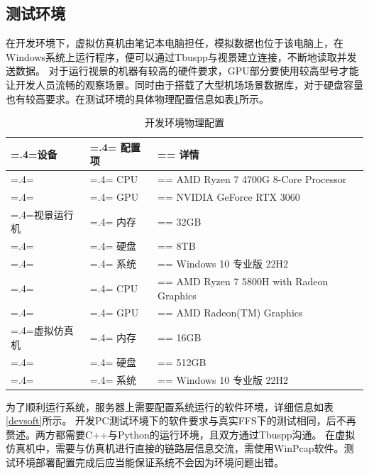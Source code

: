 \subsection{测试环境}
在开发环境下，虚拟仿真机由笔记本电脑担任，模拟数据也位于该电脑上，在Windows系统上运行程序，便可以通过Tbuspp与视景建立连接，不断地读取并发送数据。
对于运行视景的机器有较高的硬件要求，GPU部分要使用较高型号才能让开发人员流畅的观察场景。同时由于搭载了大型机场场景数据库，对于硬盘容量也有较高要求。在测试环境的具体物理配置信息如表\ref{devhard}所示。
\begin{table}[h!]
    \begin{center}
        \caption{开发环境物理配置}
        \renewcommand\arraystretch{1.5}
        \label{devhard}
        \begin{tabularx}{\textwidth}{ 
             >{\centering\arraybackslash\hsize=.4\hsize\linewidth=\hsize}X 
             >{\centering\arraybackslash\hsize=.4\hsize\linewidth=\hsize}X 
             >{\centering\arraybackslash\hsize=\hsize\linewidth=\hsize}X 
             }
             \hline
            \textbf{设备} & \textbf{配置项} & \textbf{详情}\\
             \hline
             & CPU & AMD Ryzen 7 4700G 8-Core Processor\\
           
             & GPU & NVIDIA GeForce RTX 3060\\
             
             视景运行机 & 内存 & 32GB\\
            
             & 硬盘 & 8TB\\
             
             & 系统 & Windows 10 专业版 22H2\\
             \hline
             & CPU & AMD Ryzen 7 5800H with Radeon Graphics\\
           
             & GPU & AMD Radeon(TM) Graphics\\
             
             虚拟仿真机 & 内存 & 16GB\\
            
             & 硬盘 & 512GB\\
             
             & 系统 & Windows 10 专业版 22H2\\
             \hline
            \end{tabularx}
    \end{center}
\end{table}
\par
为了顺利运行系统，服务器上需要配置系统运行的软件环境，详细信息如表\ref{devsoft}所示。
开发PC测试环境下的软件要求与真实FFS下的测试相同，后不再赘述。两方都需要C++与Python的运行环境，且双方通过Tbuspp沟通。
在虚拟仿真机中，需要与仿真机进行直接的链路层信息交流，需使用WinPcap软件。测试环境部署配置完成后应当能保证系统不会因为环境问题出错。

